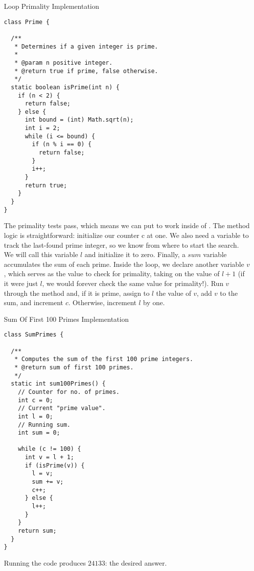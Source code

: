 \begin{cl}{Loop Primality Implementation}
\begin{lstlisting}[language=MyJava]
class Prime {

  /**
   * Determines if a given integer is prime.
   * 
   * @param n positive integer.
   * @return true if prime, false otherwise.
   */
  static boolean isPrime(int n) {
    if (n < 2) { 
      return false;
    } else {
      int bound = (int) Math.sqrt(n);
      int i = 2;
      while (i <= bound) {
        if (n % i == 0) {
          return false;
        }
        i++;
      }
      return true;
    }
  }
}
\end{lstlisting}
\end{cl}

The primality tests pass, which means we can put  to work inside of . The method logic is straightforward: initialize our counter c at one. We also need a variable to track the last-found prime integer, so we know from where to start the search. We will call this variable $l$ and initialize it to zero. Finally, a $\mathit{sum}$ variable accumulates the sum of each prime. Inside the loop, we declare another variable $v$, which serves as the value to check for primality, taking on the value of $l + 1$ (if it were just $l$, we would forever check the same value for primality!). Run $v$ through the  method and, if it is prime, assign to $l$ the value of $v$, add $v$ to the sum, and increment $c$. Otherwise, increment $l$ by one.

\begin{cl}{Sum Of First 100 Primes Implementation}
\begin{lstlisting}[language=MyJava]
class SumPrimes {

  /**
   * Computes the sum of the first 100 prime integers.
   * @return sum of first 100 primes.
   */
  static int sum100Primes() {
    // Counter for no. of primes.
    int c = 0;   
    // Current "prime value".
    int l = 0;   
    // Running sum.
    int sum = 0; 
    
    while (c != 100) {
      int v = l + 1;
      if (isPrime(v)) {
        l = v;
        sum += v;
        c++;
      } else {
        l++;
      }
    }
    return sum;
  }
}
\end{lstlisting}
\end{cl}

Running the code produces $24133$: the desired answer.


